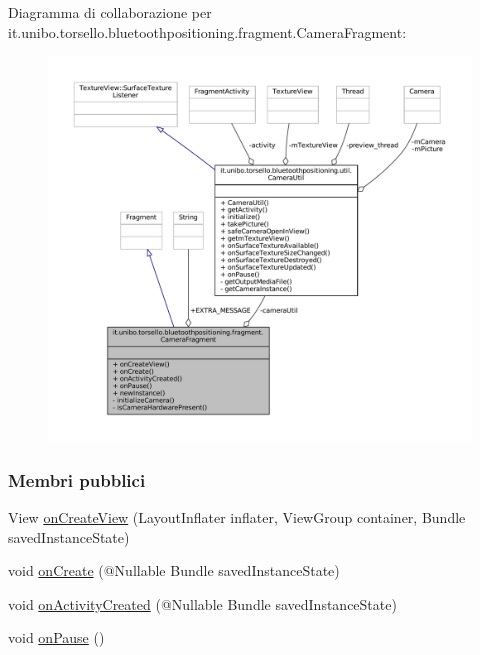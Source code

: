 Diagramma di collaborazione per it.\+unibo.\+torsello.\+bluetoothpositioning.\+fragment.\+Camera\+Fragment\+:
\nopagebreak
\begin{figure}[H]
\begin{center}
\leavevmode
\includegraphics[width=350pt]{classit_1_1unibo_1_1torsello_1_1bluetoothpositioning_1_1fragment_1_1CameraFragment__coll__graph}
\end{center}
\end{figure}
\subsubsection*{Membri pubblici}
\begin{DoxyCompactItemize}
\item 
View \hyperlink{classit_1_1unibo_1_1torsello_1_1bluetoothpositioning_1_1fragment_1_1CameraFragment_a3a80f360922bd6a8c749cda2a09c64cf_a3a80f360922bd6a8c749cda2a09c64cf}{on\+Create\+View} (Layout\+Inflater inflater, View\+Group container, Bundle saved\+Instance\+State)
\item 
void \hyperlink{classit_1_1unibo_1_1torsello_1_1bluetoothpositioning_1_1fragment_1_1CameraFragment_a33a16a26a087e288d351032db23c22a1_a33a16a26a087e288d351032db23c22a1}{on\+Create} (@Nullable Bundle saved\+Instance\+State)
\item 
void \hyperlink{classit_1_1unibo_1_1torsello_1_1bluetoothpositioning_1_1fragment_1_1CameraFragment_a3af6cb206d2194e7d580cf511a97d6f1_a3af6cb206d2194e7d580cf511a97d6f1}{on\+Activity\+Created} (@Nullable Bundle saved\+Instance\+State)
\item 
void \hyperlink{classit_1_1unibo_1_1torsello_1_1bluetoothpositioning_1_1fragment_1_1CameraFragment_a3fb58eb9f1f5a3e516b9b21aa3e1e43d_a3fb58eb9f1f5a3e516b9b21aa3e1e43d}{on\+Pause} ()
\end{DoxyCompactItemize}
